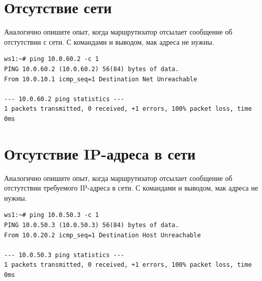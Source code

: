 \documentclass[a4paper,12pt]{article}
\begin{document}
\section{Отсутствие сети}

Аналогично опишите опыт, когда маршрутизатор отсылает сообщение об отстутствии с сети.
С командами и выводом, мак адреса не нужны.

\begin{Verbatim}
ws1:~# ping 10.0.60.2 -c 1
PING 10.0.60.2 (10.0.60.2) 56(84) bytes of data.
From 10.0.10.1 icmp_seq=1 Destination Net Unreachable

--- 10.0.60.2 ping statistics ---
1 packets transmitted, 0 received, +1 errors, 100% packet loss, time 0ms
\end{Verbatim}


\section{Отсутствие IP-адреса в сети}

Аналогично опишите опыт, когда маршрутизатор отсылает сообщение об отстутствии требуемого IP-адреса в сети.
С командами и выводом, мак адреса не нужны.

\begin{Verbatim}
ws1:~# ping 10.0.50.3 -c 1
PING 10.0.50.3 (10.0.50.3) 56(84) bytes of data.
From 10.0.20.2 icmp_seq=1 Destination Host Unreachable

--- 10.0.50.3 ping statistics ---
1 packets transmitted, 0 received, +1 errors, 100% packet loss, time 0ms
\end{Verbatim}
\end{document}
